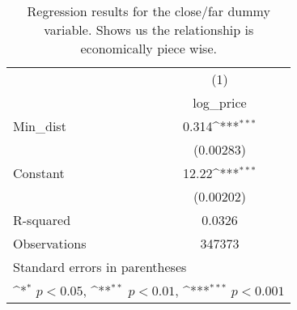 {
\def\sym#1{\ifmmode^{#1}\else\(^{#1}\)\fi}
\begin{longtable}{l*{1}{c}}
\caption{Regression results for the close/far dummy variable. Shows us the relationship is economically piece wise.}\\
\toprule\endfirsthead\midrule\endhead\midrule\endfoot\endlastfoot
                    &\multicolumn{1}{c}{(1)}\\
                    &\multicolumn{1}{c}{log\_price}\\
\midrule
Min\_dist            &       0.314\sym{***}\\
                    &   (0.00283)         \\
\addlinespace
Constant            &       12.22\sym{***}\\
                    &   (0.00202)         \\
\midrule
R-squared           &      0.0326         \\
Observations        &      347373         \\
\bottomrule
\multicolumn{2}{l}{\footnotesize Standard errors in parentheses}\\
\multicolumn{2}{l}{\footnotesize \sym{*} \(p<0.05\), \sym{**} \(p<0.01\), \sym{***} \(p<0.001\)}\\
\end{longtable}
\label{tab:full_simple_regression_results_w_dummy}
}
